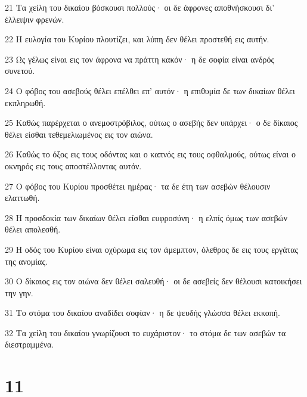 \par 21 Τα χείλη του δικαίου βόσκουσι πολλούς· οι δε άφρονες αποθνήσκουσι δι' έλλειψιν φρενών.
\par 22 Η ευλογία του Κυρίου πλουτίζει, και λύπη δεν θέλει προστεθή εις αυτήν.
\par 23 Ως γέλως είναι εις τον άφρονα να πράττη κακόν· η δε σοφία είναι ανδρός συνετού.
\par 24 Ο φόβος του ασεβούς θέλει επέλθει επ' αυτόν· η επιθυμία δε των δικαίων θέλει εκπληρωθή.
\par 25 Καθώς παρέρχεται ο ανεμοστρόβιλος, ούτως ο ασεβής δεν υπάρχει· ο δε δίκαιος θέλει είσθαι τεθεμελιωμένος εις τον αιώνα.
\par 26 Καθώς το όξος εις τους οδόντας και ο καπνός εις τους οφθαλμούς, ούτως είναι ο οκνηρός εις τους αποστέλλοντας αυτόν.
\par 27 Ο φόβος του Κυρίου προσθέτει ημέρας· τα δε έτη των ασεβών θέλουσιν ελαττωθή.
\par 28 Η προσδοκία των δικαίων θέλει είσθαι ευφροσύνη· η ελπίς όμως των ασεβών θέλει απολεσθή.
\par 29 Η οδός του Κυρίου είναι οχύρωμα εις τον άμεμπτον, όλεθρος δε εις τους εργάτας της ανομίας.
\par 30 Ο δίκαιος εις τον αιώνα δεν θέλει σαλευθή· οι δε ασεβείς δεν θέλουσι κατοικήσει την γην.
\par 31 Το στόμα του δικαίου αναδίδει σοφίαν· η δε ψευδής γλώσσα θέλει εκκοπή.
\par 32 Τα χείλη του δικαίου γνωρίζουσι το ευχάριστον· το στόμα δε των ασεβών τα διεστραμμένα.

\chapter{11}

